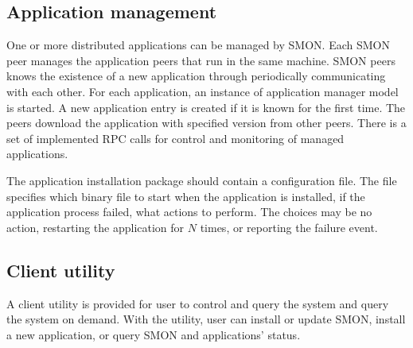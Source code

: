 \subsection{Application management}

One or more distributed applications can be managed by SMON.
Each SMON peer manages the application peers that run in the
same machine. SMON peers knows the existence of a new
application through periodically communicating with each
other. For each application, an instance of application
manager model is started.  A new application entry is
created if it is known for the first time.  The peers
download the application with specified version from other
peers. There is a set of implemented RPC calls for control
and monitoring of managed applications.


The application installation package should contain a
configuration file. The file specifies which binary file to
start when the application is installed, if the application
process failed, what actions to perform. The choices may be
no action, restarting the application for $N$ times, or
reporting the failure event.

\subsection{Client utility}
\label{subsec:client}

A client utility is provided for user to control and query
the system and query the system on demand. With the utility,
user can install or update SMON, install a new application,
or query SMON and applications' status.


